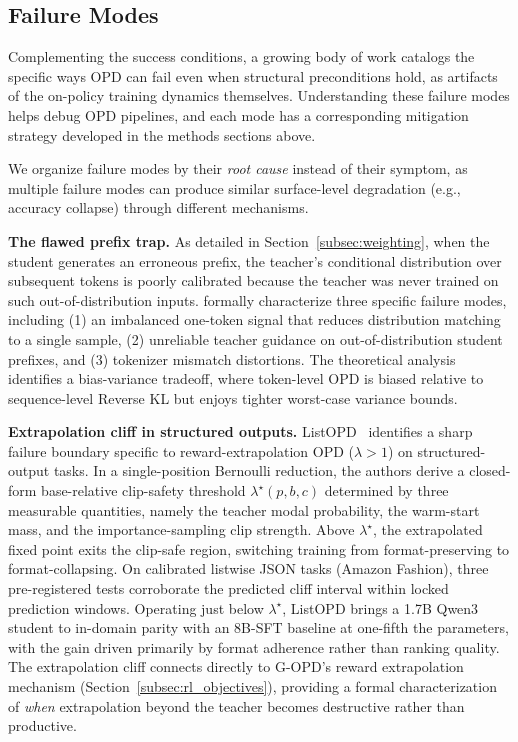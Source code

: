 \documentclass{article} %
\begin{document}
\subsection{Failure Modes}
\label{subsec:failure}

Complementing the success conditions, a growing body of work catalogs the specific ways OPD can fail even when structural preconditions hold, as artifacts of the on-policy training dynamics themselves. Understanding these failure modes helps debug OPD pipelines, and each mode has a corresponding mitigation strategy developed in the methods sections above.

We organize failure modes by their \emph{root cause} instead of their symptom, as multiple failure modes can produce similar surface-level degradation (e.g., accuracy collapse) through different mechanisms.

\textbf{The flawed prefix trap.} As detailed in Section~\ref{subsec:weighting}, when the student generates an erroneous prefix, the teacher's conditional distribution over subsequent tokens is poorly calibrated because the teacher was never trained on such out-of-distribution inputs. \citet{2603.25562} formally characterize three specific failure modes, including (1) an imbalanced one-token signal that reduces distribution matching to a single sample, (2) unreliable teacher guidance on out-of-distribution student prefixes, and (3) tokenizer mismatch distortions. The theoretical analysis identifies a bias-variance tradeoff, where token-level OPD is biased relative to sequence-level Reverse KL but enjoys tighter worst-case variance bounds.

\textbf{Extrapolation cliff in structured outputs.} ListOPD~\citep{2605.08737} identifies a sharp failure boundary specific to reward-extrapolation OPD ($\lambda > 1$) on structured-output tasks. In a single-position Bernoulli reduction, the authors derive a closed-form base-relative clip-safety threshold $\lambda^\star(p, b, c)$ determined by three measurable quantities, namely the teacher modal probability, the warm-start mass, and the importance-sampling clip strength. Above $\lambda^\star$, the extrapolated fixed point exits the clip-safe region, switching training from format-preserving to format-collapsing. On calibrated listwise JSON tasks (Amazon Fashion), three pre-registered tests corroborate the predicted cliff interval within locked prediction windows. Operating just below $\lambda^\star$, ListOPD brings a 1.7B Qwen3 student to in-domain parity with an 8B-SFT baseline at one-fifth the parameters, with the gain driven primarily by format adherence rather than ranking quality. The extrapolation cliff connects directly to G-OPD's reward extrapolation mechanism (Section~\ref{subsec:rl_objectives}), providing a formal characterization of \emph{when} extrapolation beyond the teacher becomes destructive rather than productive.
\end{document}
